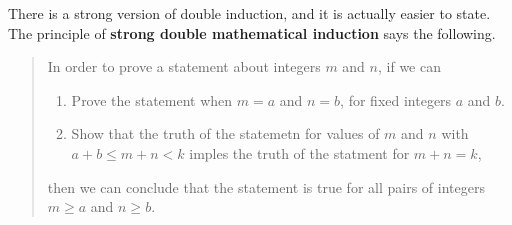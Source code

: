 \documentclass[10pt,]{book}
\newcommand{\terminology}[1]{\textbf{#1}}
\theoremstyle{plain}
\theoremstyle{definition}
\theoremstyle{definition}
\numberwithin{equation}{chapter}
\newcommand{\lt}{<}
\begin{document}
There is a strong version of double induction, and it is actually easier to state. The principle of \terminology{strong double mathematical induction}    says the following.%
\begin{quote}\hypertarget{blockquote-13}{}
In order to prove a statement about integers \(m\) and \(n\), if we can \leavevmode%
\begin{enumerate}
\item\hypertarget{li-22}{}Prove the statement when \(m=a\) and \(n=b\), for fixed integers \(a\) and \(b\).%
\item\hypertarget{li-23}{}Show that the truth of the statemetn for values of \(m\) and \(n\) with \(a+b\leq m+n \lt k\) imples the truth of the statment for \(m+n=k\),%
\end{enumerate}
 then we can conclude that the statement is true for all pairs of integers \(m\geq a\) and \(n\geq b\).%
\end{quote}
\end{document}
